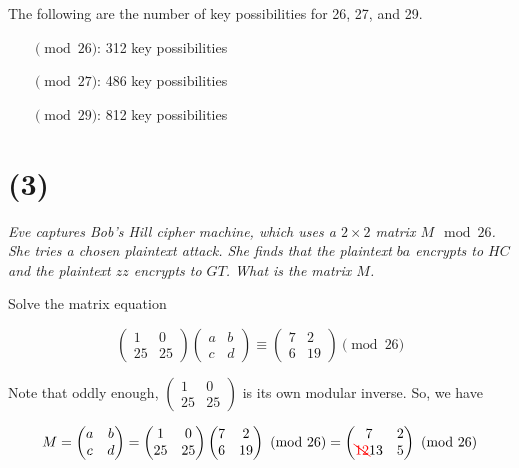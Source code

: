 \documentclass[12pt]{article}
\begin{document}
    The following are the number of key possibilities for 26, 27, and 29.

    \begin{itemize}
      \item[$\pmod{26}$:] 312 key possibilities
      \item[$\pmod{27}$:] 486 key possibilities
      \item[$\pmod{29}$:] 812 key possibilities
    \end{itemize}

\section*{(3)} \textit{Eve captures Bob’s Hill cipher machine, which uses a $2\times2$ matrix $M \mod{26}$. She tries a chosen plaintext attack. She finds that the plaintext $ba$ encrypts to $HC$ and the plaintext $zz$ encrypts to $GT$. What is the matrix $M$.}

    Solve the matrix equation

    $$\begin{pmatrix}1 & 0\\25 & 25\end{pmatrix}\begin{pmatrix}a & b\\c & d\end{pmatrix} \equiv \begin{pmatrix}7 & 2\\6 & 19\end{pmatrix} \pmod{26}$$

    Note that oddly enough, $\begin{pmatrix}1 & 0\\25 & 25\end{pmatrix}$ is its own modular inverse. So, we have

    $$M = \begin{pmatrix}a & b\\c & d\end{pmatrix} = \begin{pmatrix}1 & 0\\25 & 25\end{pmatrix}\begin{pmatrix}7 & 2\\6 & 19\end{pmatrix} \pmod{26} = \begin{pmatrix}7 & 2\\ {\color{red}\bcancel{12}} 13 & 5\end{pmatrix} \pmod{26}$$
\end{document}
